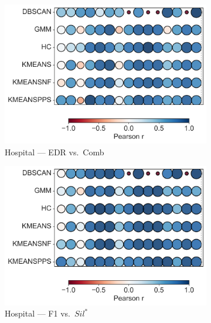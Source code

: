 \documentclass[10pt]{article} %
\numberwithin{equation}{section}
\begin{document}
\begin{figure}[htbp]
  \begin{subfigure}[b]{0.33\linewidth}
    \includegraphics[width=\linewidth]{figures/6.4.3graph/HO_EDR_vs_Combined Score.pdf}
    \caption{Hospital — EDR vs.\ Comb}
    \label{fig:ho_edr_comb}
  \end{subfigure}\hfill
  \begin{subfigure}[b]{0.33\linewidth}
    \includegraphics[width=\linewidth]{figures/6.4.3graph/HO_F1_vs_Silhouette Score.pdf}
    \caption{Hospital — F1 vs.\ $Sil^\ast$}
    \label{fig:ho_f1_sil}
  \end{subfigure}\hfill
  \begin{subfigure}[b]{0.33\linewidth}

\end{subfigure}
\end{figure}
\end{document}
